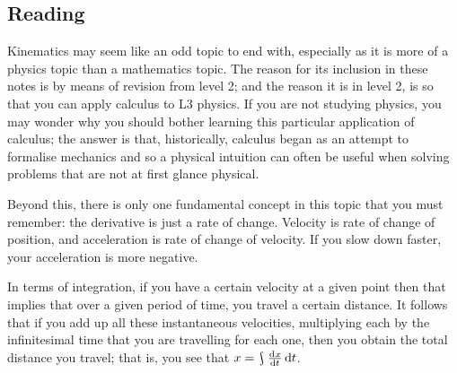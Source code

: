 


\subsection*{Reading}
Kinematics may seem like an odd topic to end with, especially as it is more of a physics topic than a mathematics topic. The
reason for its inclusion in these notes is by means of revision from level 2; and the reason it is in level 2, is so that you
can apply calculus to L3 physics. If you are not studying physics, you may wonder why you should bother learning this particular
application of calculus; the answer is that, historically, calculus began as an attempt to formalise mechanics and so a physical
intuition can often be useful when solving problems that are not at first glance physical.

Beyond this, there is only one fundamental concept in this topic that you must remember: the derivative is just a rate of
change. Velocity is rate of change of position, and acceleration is rate of change of velocity. If you slow down faster,
your acceleration is more negative.

In terms of integration, if you have a certain velocity at a given point then that implies that over a given period of
time, you travel a certain distance. It follows that if you add up all these instantaneous velocities, multiplying each
by the infinitesimal time that you are travelling for each one, then you obtain the total distance you travel; that is,
you see that $ x = \rint \od{x}{t} \dif{t} $.

\clearpage
